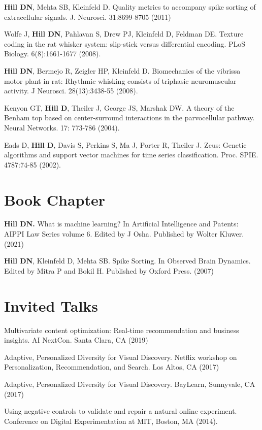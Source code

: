\documentclass[line,11pt]{res}
\begin{document}
\begin{resume}
\textbf{Hill DN}, Mehta SB, Kleinfeld D.  Quality metrics to accompany spike sorting of extracellular signals. J. Neurosci. 31:8699-8705 (2011)

Wolfe J, \textbf{Hill DN}, Pahlavan S, Drew PJ, Kleinfeld D, Feldman DE. Texture coding in the rat whisker system: slip-stick versus differential encoding. PLoS Biology. 6(8):1661-1677 (2008). 

\textbf{Hill DN}, Bermejo R, Zeigler HP, Kleinfeld D. Biomechanics of the vibrissa motor plant in rat: Rhythmic whisking consists of triphasic neuromuscular activity. J Neurosci. 28(13):3438-55 (2008). 

Kenyon GT, \textbf{Hill D}, Theiler J, George JS, Marshak DW. A theory of the Benham top based on center-surround interactions in the parvocellular pathway. Neural Networks. 17: 773-786 (2004). 

Eads D, \textbf{Hill D}, Davis S, Perkins S, Ma J, Porter R, Theiler J. Zeus: Genetic algorithms and support vector machines for time series classification. Proc. SPIE. 4787:74-85 (2002).

\section{Book Chapter}
\vspace{0.1in}

\textbf{Hill DN.} What is machine learning? In Artificial Intelligence and Patents: AIPPI Law Series volume 6. Edited by J Osha. Published by Wolter Kluwer. (2021)

\textbf{Hill DN}, Kleinfeld D, Mehta SB. Spike Sorting. In Observed Brain Dynamics. Edited by Mitra P and Bokil H. Published by Oxford Press. (2007)

\section{Invited Talks}
\vspace{0.1in}

Multivariate content optimization: Real-time recommendation and business insights. AI NextCon. Santa Clara, CA (2019)

Adaptive, Personalized Diversity for Visual Discovery. Netflix workshop on Personalization, Recommendation, and Search. Los Altos, CA (2017)

Adaptive, Personalized Diversity for Visual Discovery. BayLearn, Sunnyvale, CA (2017)

Using negative controls to validate and repair a natural online experiment.  Conference on Digital Experimentation at MIT, Boston, MA (2014).


\end{resume}
\end{document}
